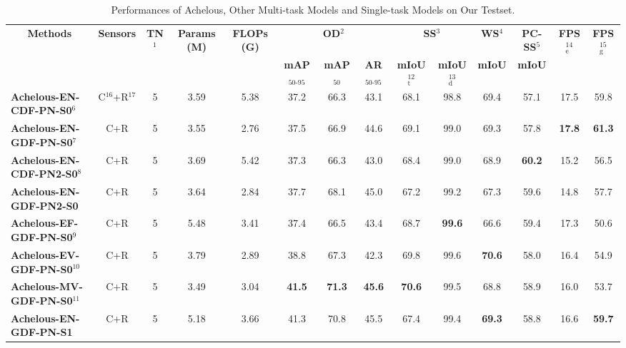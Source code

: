 \documentclass[letterpaper, 10 pt, conference]{ieeeconf}
\begin{document}
\begin{table*}
\center
\footnotesize
\setlength\tabcolsep{2.2pt}
\caption{Performances of Achelous, Other Multi-task Models and Single-task Models on Our Testset.}
  \label{tab:prediction_results}
\begin{tabular}{l|cc|cc|ccc|cc|c|c|cc}
\toprule
\multicolumn{1}{c}{\multirow{2}[2]{*}{\textbf{Methods}}} &
\multicolumn{1}{c}{\multirow{2}[2]{*}{\textbf{Sensors}}} &
\multicolumn{1}{c}{\multirow{2}[2]{*}{\textbf{TN$^1$}}} & 
\multicolumn{1}{c}{\multirow{2}[2]{*}{\textbf{Params (M)}}} & 
\multicolumn{1}{c}{\multirow{2}[2]{*}{\textbf{FLOPs (G)}}} & 
\multicolumn{3}{c}{\bf{OD$^2$}} &
\multicolumn{2}{c}{\bf{SS$^3$}} & 
\multicolumn{1}{c}{\bf{WS$^4$}} & 
\multicolumn{1}{c}{\bf{PC-SS$^5$}} & 
\multicolumn{1}{c}{\multirow{2}[2]{*}{\textbf{FPS$_{\text{e}}^{14}$}}} &
\multicolumn{1}{c}{\multirow{2}[2]{*}{\textbf{FPS$_{\text{g}}^{15}$}}}
  \\ \cmidrule(lr){6-8}\cmidrule(lr){9-10}\cmidrule(lr){11-11}\cmidrule(lr){12-12}
\multicolumn{5}{c}{} & \bf{mAP$_{50\text{-}95}$} & \bf{mAP$_{50}$} & \bf{AR$_{50\text{-}95}$} & \bf{mIoU$_{\text{t}}^{12}$} & \bf{mIoU$_{\text{d}}^{13}$} & \bf{mIoU} & \bf{mIoU}     
\\\midrule
\textbf{Achelous-EN-CDF-PN-S0}$^6$ & C$^{16}$+R$^{17}$ & 5 & 3.59 & 5.38 & 37.2 & 66.3 & 43.1 & 68.1 & 98.8 & 69.4 & 57.1 & 17.5 & 59.8 \\
\textbf{Achelous-EN-GDF-PN-S0}$^7$ & C+R & 5 & 3.55 & 2.76 & 37.5 & 66.9 & 44.6 & 69.1 & 99.0 & 69.3 & 57.8 & \textbf{17.8} & \textbf{61.3} \\
\textbf{Achelous-EN-CDF-PN2-S0}$^8$ & C+R & 5 & 3.69 & 5.42 & 37.3 & 66.3 & 43.0 & 68.4 & 99.0 & 68.9 & \textbf{60.2} & 15.2 & 56.5 \\
\textbf{Achelous-EN-GDF-PN2-S0} & C+R & 5 & 3.64 & 2.84 & 37.7 & 68.1 & 45.0 & 67.2 & 99.2 & 67.3 & 59.6 & 14.8 & 57.7   \\
\textbf{Achelous-EF-GDF-PN-S0}$^9$ & C+R & 5 & 5.48 & 3.41 & 37.4 & 66.5 & 43.4 & 68.7 & \textbf{99.6} & 66.6 & 59.4 & 17.3 & 50.6  \\
\textbf{Achelous-EV-GDF-PN-S0}$^{10}$ & C+R & 5 & 3.79 & 2.89 & 38.8 & 67.3 & 42.3 & 69.8 & 99.6 & \textbf{70.6} & 58.0 & 16.4 & 54.9 \\
\textbf{Achelous-MV-GDF-PN-S0}$^{11}$ & C+R & 5 & 3.49 & 3.04 & \textbf{41.5} & \textbf{71.3} & \textbf{45.6} & \textbf{70.6} & 99.5 & 68.8 & 58.9 & 16.0 & 53.7  \\
\midrule
\textbf{Achelous-EN-GDF-PN-S1} & C+R & 5 & 5.18 & 3.66 & 41.3 & 70.8 & 45.5 & 67.4 & 99.4 & \textbf{69.3} & 58.8 & 16.6 & \textbf{59.7} \\

\end{tabular}
\end{table*}
\end{document}
